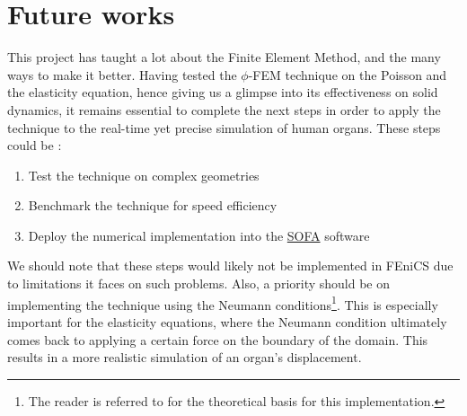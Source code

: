 
\chapter{Future works} %

\label{Chapter6} %

This project has taught a lot about the Finite Element Method, and the many ways to make it better. Having tested the $\phi$-FEM technique on the Poisson and the elasticity equation, hence giving us a glimpse into its effectiveness on solid dynamics, it remains essential to complete the next steps in order to apply the technique to the real-time yet precise simulation of human organs. These steps could be :

\begin{enumerate}
    \item Test the technique on complex geometries
    \item Benchmark the technique for speed efficiency
    \item Deploy the numerical implementation into the \href{https://www.sofa-framework.org/}{SOFA} software
\end{enumerate}

\noindent We should note that these steps would likely not be implemented in FEniCS due to limitations it faces on such problems. Also, a priority should be on implementing the \phifem technique using the Neumann conditions\footnote{The reader is referred to \cite{Reference4} for the theoretical basis for this implementation.}. This is especially important for the elasticity equations, where the Neumann condition ultimately comes back to applying a certain force on the boundary of the domain. This results in a more realistic simulation of an organ's displacement. 

